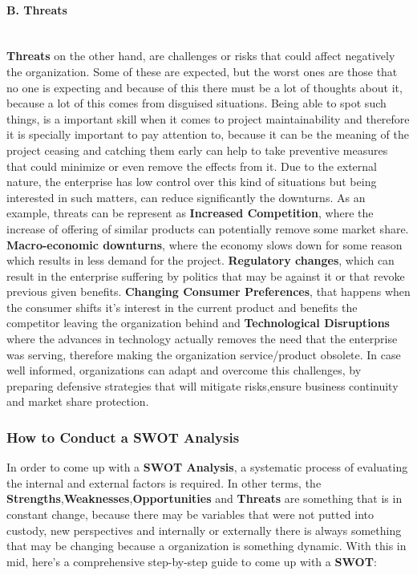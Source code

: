 \paragraph{B. Threats}\mbox{}\\
\textbf{Threats} on the other hand, are challenges or risks that could affect negatively the organization. Some of these are expected, but the worst ones are those that no one is expecting and because of this there must be a lot of thoughts about it, because a lot of this comes from disguised situations. Being able to spot such things, is a important skill when it comes to project maintainability and therefore it is specially important to pay attention to, because it can be the meaning of the project ceasing and catching them early can help to take preventive measures that could minimize or even remove the effects from it. Due to the external nature, the enterprise has low control over this kind of situations but being interested in such matters, can reduce significantly the downturns.
As an example, threats can be represent as \textbf{Increased Competition}, where the increase of offering of similar products can potentially remove some market share. \textbf{Macro-economic downturns}, where the economy slows down for some reason which results in less demand for the project. \textbf{Regulatory changes}, which can result in the enterprise suffering by politics that may be against it or that revoke previous given benefits. \textbf{Changing Consumer Preferences}, that happens when the consumer shifts it's interest in the current product and benefits the competitor leaving the organization behind and \textbf{Technological Disruptions} where the advances in technology actually removes the need that the enterprise was serving, therefore making the organization service/product obsolete.
In case well informed, organizations can adapt and overcome this challenges, by preparing defensive strategies that will mitigate risks,ensure business continuity and market share protection.

\subsubsection{How to Conduct a SWOT Analysis}
In order to come up with a \textbf{SWOT Analysis}, a systematic process of evaluating the internal and external factors is required. In other terms, the \textbf{Strengths},\textbf{Weaknesses},\textbf{Opportunities} and \textbf{Threats} are something that is in constant change, because there may be variables that were not putted into custody, new perspectives and internally or externally there is always something that may be changing because a organization is something dynamic. 
With this in mid, here's a comprehensive step-by-step guide to come up with a \textbf{SWOT}:  

